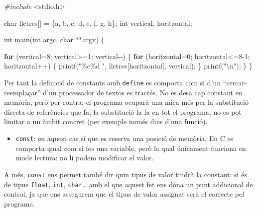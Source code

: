 \documentclass[]{book}
\newenvironment{Shaded}{\begin{snugshade}}{\end{snugshade}}
\newcommand{\CharTok}[1]{\textcolor[rgb]{0.31,0.60,0.02}{#1}}
\newcommand{\ControlFlowTok}[1]{\textcolor[rgb]{0.13,0.29,0.53}{\textbf{#1}}}
\newcommand{\DataTypeTok}[1]{\textcolor[rgb]{0.13,0.29,0.53}{#1}}
\newcommand{\DecValTok}[1]{\textcolor[rgb]{0.00,0.00,0.81}{#1}}
\newcommand{\ImportTok}[1]{#1}
\newcommand{\NormalTok}[1]{#1}
\newcommand{\PreprocessorTok}[1]{\textcolor[rgb]{0.56,0.35,0.01}{\textit{#1}}}
\newcommand{\SpecialCharTok}[1]{\textcolor[rgb]{0.00,0.00,0.00}{#1}}
\newcommand{\StringTok}[1]{\textcolor[rgb]{0.31,0.60,0.02}{#1}}
\providecommand{\tightlist}{%
  \setlength{\itemsep}{0pt}\setlength{\parskip}{0pt}}
\begin{document}
\begin{Shaded}
\begin{Highlighting}[]
\PreprocessorTok{\#include }\ImportTok{\textless{}stdio.h\textgreater{}}

\DataTypeTok{char}\NormalTok{ lletres[] = \{}\CharTok{\textquotesingle{}a\textquotesingle{}}\NormalTok{, }\CharTok{\textquotesingle{}b\textquotesingle{}}\NormalTok{, }\CharTok{\textquotesingle{}c\textquotesingle{}}\NormalTok{, }\CharTok{\textquotesingle{}d\textquotesingle{}}\NormalTok{, }\CharTok{\textquotesingle{}e\textquotesingle{}}\NormalTok{, }\CharTok{\textquotesingle{}f\textquotesingle{}}\NormalTok{, }\CharTok{\textquotesingle{}g\textquotesingle{}}\NormalTok{, }\CharTok{\textquotesingle{}h\textquotesingle{}}\NormalTok{\};}
\DataTypeTok{int}\NormalTok{ vertical, horitzontal;}

\DataTypeTok{int}\NormalTok{ main(}\DataTypeTok{int}\NormalTok{ argc, }\DataTypeTok{char}\NormalTok{ **argv) \{}

    \ControlFlowTok{for}\NormalTok{ (vertical=}\DecValTok{8}\NormalTok{; vertical\textgreater{}=}\DecValTok{1}\NormalTok{; vertical{-}{-}) \{}
        \ControlFlowTok{for}\NormalTok{ (horitzontal=}\DecValTok{0}\NormalTok{; horitzontal\textless{}=}\DecValTok{8}\NormalTok{{-}}\DecValTok{1}\NormalTok{; horitzontal++) \{}
\NormalTok{            printf(}\StringTok{"\%c\%d "}\NormalTok{, lletres[horitzontal], vertical);}
\NormalTok{        \}}
\NormalTok{        printf(}\StringTok{"}\SpecialCharTok{\textbackslash{}n}\StringTok{"}\NormalTok{);}
\NormalTok{    \}}
\NormalTok{\}}
\end{Highlighting}
\end{Shaded}

Per tant la definició de constants amb \texttt{define} es comporta com si d'un ``cercar-reemplaçar'' d'un processador de textos es tractés. No es desa cap constant en memòria, però per contra, el programa ocuparà una mica més per la substitució directa de referències que fa; la substitució la fa en tot el programa, no es pot limitar a un àmbit concret (per exemple només dins d'una funció).

\begin{itemize}
\tightlist
\item
  \texttt{const}: en aquest cas sí que es reserva una posició de memòria. En C es comporta igual com si fos una variable, però la qual únicament funciona en mode lectura: no li podem modificar el valor.
\end{itemize}

A més, \texttt{const} ens permet també dir quin tipus de valor tindrà la constant: si és de tipus \texttt{float}, \texttt{int}, \texttt{char}\ldots{} amb el que aquest fet ens dóna un punt addicional de control, ja que ens assegurem que el tipus de valor assignat serà el correcte pel programa.
\end{document}
